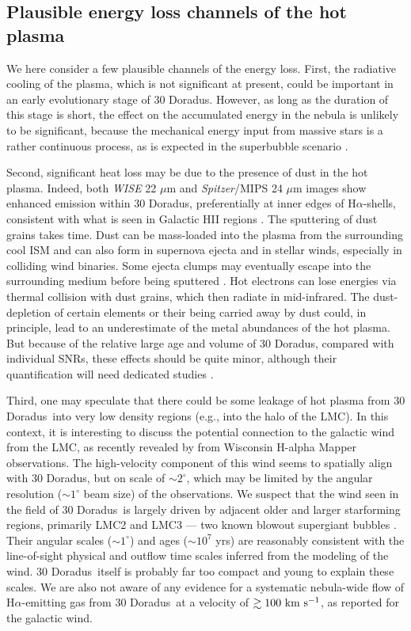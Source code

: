 \documentclass[usenatbib]{mnras}
\def\xs{30 Doradus}
\begin{document}
\subsection{Plausible energy loss channels of the hot plasma}

 We here consider a few plausible channels of the energy loss. First,  the radiative cooling of the plasma, which is not significant at present, could be important in an early evolutionary stage of \xs. However, as long as the duration of this stage is short, the effect on the accumulated energy in the nebula is unlikely to be significant, because the mechanical energy input from massive stars is a rather continuous process, as is expected in the superbubble scenario \citep{Mac}. 

Second, significant heat loss may be due to the presence of dust in the hot plasma.  Indeed, both {\sl WISE} 22 $\mu$m and {\sl Spitzer}/MIPS 24 $\mu$m images  \citep[e.g.,][]{Meixner2006} show enhanced emission within \xs, preferentially at inner edges of H$\alpha$-shells, consistent with what is seen in Galactic HII regions  \citep[e.g,][]{Churchwell2009,Paladini2012}. The sputtering of dust grains takes time. Dust can be mass-loaded into the plasma from the surrounding cool ISM and can also form in supernova ejecta and in stellar winds, especially in colliding wind binaries. Some ejecta clumps may eventually escape into the surrounding medium before being sputtered \citep{Martinez-Gonzalez2018,Slavin2020}.  Hot electrons can lose energies via thermal collision with dust grains, which then radiate in mid-infrared.  The dust-depletion of certain elements  or their being carried away by dust could, in principle, lead to an underestimate of the metal abundances of the hot plasma.  But because of the relative large age and volume of \xs, compared with individual SNRs, these effects should be quite minor, although their quantification will need dedicated studies \citep[e.g.][]{Martinez-Gonzalez2017}.

Third, one may speculate that there could be some leakage of hot plasma from \xs\ into very low density regions (e.g.,  into the halo of the LMC). 
In this context, it is interesting to discuss the potential connection to the galactic wind from the LMC, as recently revealed by \citep{Ciampa2021} from Wisconsin H-alpha Mapper observations. The high-velocity component of this wind seems to spatially align with \xs, but on scale of $\sim 2^\circ$, which may be limited by the angular resolution ($\sim 1^\circ$ beam size) of the observations. We suspect that the wind seen in the field of \xs\ is largely driven by adjacent older and larger starforming regions, primarily LMC2 and LMC3 — two known blowout supergiant bubbles \citep{Wang1991,Points2001}. Their angular scales ($\sim 1^\circ$) and ages ($\sim 10^7$ yrs)  are reasonably consistent with the line-of-sight physical and outflow time scales inferred from the modeling of the wind. \xs\ itself is probably far too compact and young to explain these scales. We are also not aware of any evidence for a systematic nebula-wide flow of H$\alpha$-emitting gas from \xs\ at a velocity of $\gtrsim 100 {\rm~km~s^{-1}}$, as reported for the galactic wind. 
\end{document}
